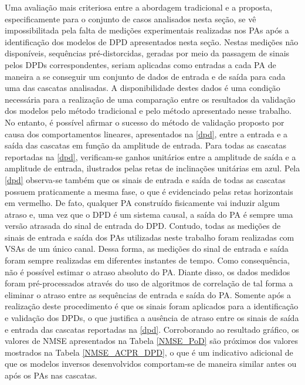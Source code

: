 {Uma avaliação mais criteriosa entre a abordagem tradicional e a proposta, especificamente para o conjunto de casos analisados nesta seção, se vê impossibilitada pela falta de medições experimentais realizadas nos PAs após a identificação dos modelos de DPD apresentados nesta seção. Nestas medições não disponíveis, sequências pré-distorcidas, geradas por meio da passagem de sinais pelos DPDs correspondentes, seriam aplicadas como entradas a cada PA de maneira a se conseguir um conjunto de dados de entrada e de saída para cada uma das cascatas analisadas. A disponibilidade destes dados é uma condição necessária para a realização de uma comparação entre os resultados da validação dos modelos pelo método tradicional e pelo método apresentado nesse trabalho. No entanto, é possível afirmar o sucesso do método de validação proposto por causa dos comportamentos lineares, apresentados na \autoref{dpd}, entre a entrada e a saída das cascatas em função da amplitude de entrada. Para todas as cascatas reportadas na \autoref{dpd}, verificam-se ganhos unitários entre a amplitude de saída e a amplitude de entrada, ilustrados pelas retas de inclinações unitárias em azul. Pela \autoref{dpd} observa-se também que os sinais de entrada e saída de todas as cascatas possuem praticamente a mesma fase, o que é evidenciado pelas retas horizontais em vermelho. De fato, qualquer PA construído fisicamente vai induzir algum atraso e, uma vez que o DPD é um sistema causal, a saída do PA é sempre uma versão atrasada do sinal de entrada do DPD. Contudo, todas as medições de sinais de entrada e saída dos PAs utilizadas neste trabalho foram realizadas com VSAs de um único canal. Dessa forma, as medições do sinal de entrada e saída foram sempre realizadas em diferentes instantes de tempo. Como consequência, não é possível estimar o atraso absoluto do PA. Diante disso, os dados medidos foram pré-processados através do uso de algoritmos de correlação de tal forma a eliminar o atraso entre as sequências de entrada e saída do PA. Somente após a realização deste procedimento é que os sinais foram aplicados para a identificação e validação dos DPDs, o que justifica a ausência de atraso entre os sinais de saída e entrada das cascatas reportadas na \autoref{dpd}. Corroborando ao resultado gráfico, os valores de NMSE apresentados na Tabela \ref{NMSE_PoD} são próximos dos valores mostrados na Tabela \ref{NMSE_ACPR_DPD}, o que é um indicativo adicional de que os modelos inversos desenvolvidos comportam-se de maneira similar antes ou após os PAs nas cascatas.}

